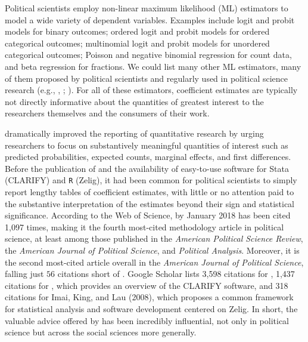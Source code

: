 \documentclass[11pt]{article}
\begin{document}
\onehalfspace



Political scientists employ non-linear maximum likelihood (ML) estimators to model a wide variety of dependent variables. Examples include logit and probit models for binary outcomes; ordered logit and probit models for ordered categorical outcomes; multinomial logit and probit models for unordered categorical outcomes; Poisson and negative binomial regression for count data, and beta regression for fractions. We could list many other ML estimators, many of them proposed by political scientists and regularly used in political science research (e.g., \citealt{Nagler1994}, \citealt{KatzKing1999}; \citealt{Mebane2000}). For all of these estimators, coefficient estimates are typically not directly informative about the quantities of greatest interest to the researchers themselves and the consumers of their work.


\cite{KingTomzWittenberg2000} dramatically improved the reporting of quantitative research by urging researchers to focus on substantively meaningful quantities of interest such as predicted probabilities, expected counts, marginal effects, and first differences. Before the publication of \cite{KingTomzWittenberg2000} and the availability of easy-to-use software for Stata (CLARIFY) and \texttt{R} (Zelig), it had been common for political scientists to simply report lengthy tables of coefficient estimates, with little or no attention paid to the substantive interpretation of the estimates beyond their sign and statistical significance. According to the Web of Science, by January 2018 \cite{KingTomzWittenberg2000} has been cited 1,097 times, making it the fourth most-cited methodology article in political science, at least among those published in the \textit{American Political Science Review}, the \textit{American Journal of Political Science}, and
\textit{Political Analysis}. Moreover, it is the second most-cited article overall in the \textit{American Journal of Political Science}, falling just $56$ citations short of \cite{BeckKatzTucker1998}. Google Scholar lists 3,598 citations for \cite{KingTomzWittenberg2000}, 1,437 citations for \cite{TomzWittenbergKing2003}, which provides an overview of the CLARIFY software, and 318 citations for Imai, King, and Lau (2008), which proposes a common framework for statistical analysis and software development centered on Zelig. In short, the valuable advice offered by \cite{KingTomzWittenberg2000} has been incredibly influential, not only in political science but across the social sciences more generally.
\end{document}
